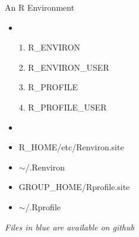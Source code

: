 \documentclass{beamer}
\begin{document}
\begin{frame}{An R Environment}

\bigskip

\begin{minipage}{0.4\textwidth}

\begin{itemize}
\item \\
\item[1.] R\_ENVIRON\\
\item[2.] R\_ENVIRON\_USER\\
\item[3.] R\_PROFILE\\
\item[4.] R\_PROFILE\_USER\\
\end{itemize}

\end{minipage}
\begin{minipage}{0.5\textwidth}

\begin{itemize}
\item 
\item {\color{red} R\_HOME/etc/Renviron.site\\}
\item {\color{blue} $\sim$/.Renviron}
\item {\color{blue} GROUP\_HOME/Rprofile.site\\}
\item {\color{green} $\sim$/.Rprofile\\}
\end{itemize}

\end{minipage}

\bigskip
\emph{Files in {\color{blue} blue} are available on github}

\end{frame}
\end{document}
